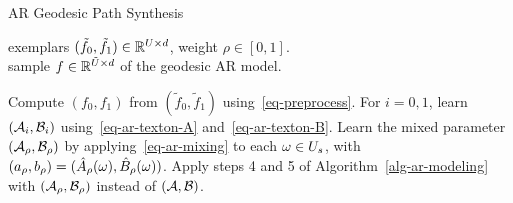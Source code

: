 \begin{algorithm}[ht!]
\caption{AR Geodesic Path Synthesis}
\label{alg-ar-geodesic}
\Require  exemplars $(\tilde f_0, \tilde f_1) \in \mathbb{R}^{U \times d}$, weight $\rho \in [0,1]$.\\
\Ensure  sample $f \in \mathbb{R}^{\tilde U \times d}$ of the geodesic AR model.
\begin{enumerate}
	 Compute $(f_0,f_1)$ from $(\tilde f_0, \tilde f_1)$
			using~\eqref{eq-preprocess}.
	 For $i=0,1$, learn $(\mathcal{A}_i,\mathcal{B}_i)$ using~\eqref{eq-ar-texton-A} and~\eqref{eq-ar-texton-B}.
	 Learn the mixed parameter $(\mathcal{A}_\rho,\mathcal{B}_\rho)$ by applying~\eqref{eq-ar-mixing} to each $\omega \in U_s$, with $(a_\rho,b_\rho) = (\hat A_\rho(\omega), \hat B_\rho(\omega))$.
	 Apply steps 4 and 5 of Algorithm~\ref{alg-ar-modeling}
		with $(\mathcal{A}_\rho,\mathcal{B}_\rho)$ instead of $(\mathcal{A},\mathcal{B})$.
\end{enumerate}
\end{algorithm}
